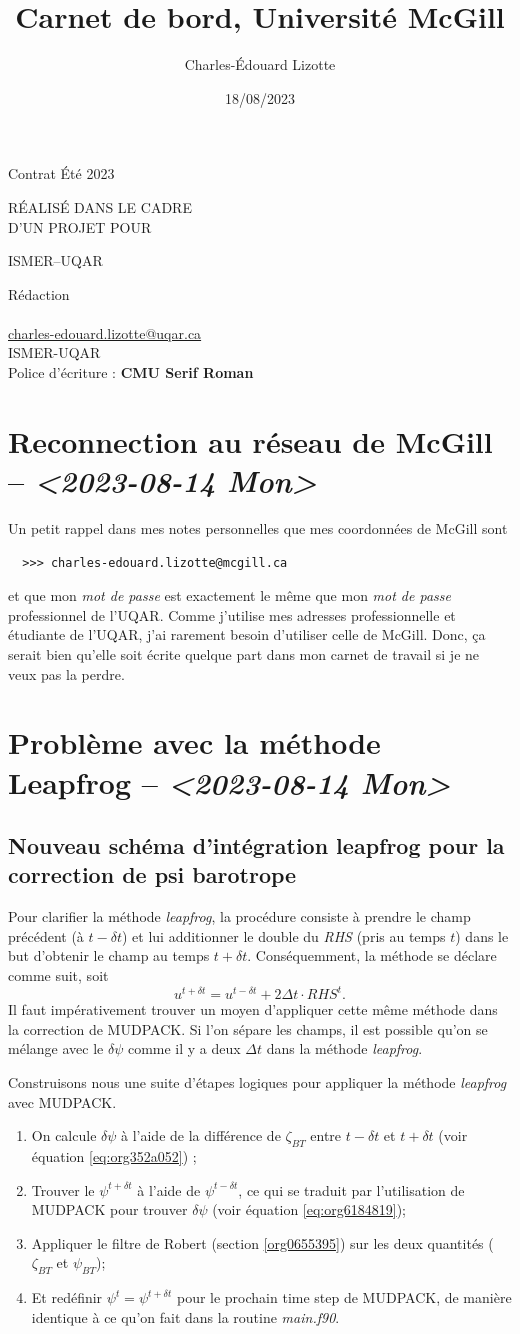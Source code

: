 \documentclass[10pt]{article}
\author{Charles-Édouard Lizotte}
\date{18/08/2023}
\title{Carnet de bord, Université McGill}
\makeatletter
\numberwithin{equation}{section}
\newcommand{\mytitlepage}{
\begin{titlepage}
\begin{center}
{\Huge \thesubtitle \par}
\vspace{2cm}
{\Huge \MakeUppercase{\thetitle} \par}
\vspace{2cm}
RÉALISÉ DANS LE CADRE\\ D'UN PROJET POUR \par
\vspace{2cm}
{\Huge ISMER--UQAR \par}
\vspace{2cm}
{\thedate}
\end{center}
\vfill
Rédaction \\
{\theauthor}\\
\url{charles-edouard.lizotte@uqar.ca}\\
ISMER-UQAR\\
Police d'écriture : \textbf{CMU Serif Roman}
\end{titlepage}
}
\newcommand{\thesubtitle}{Contrat Été 2023}
\makeatother
\begin{document}
\mytitlepage
\tableofcontents\newpage
\section{Reconnection au réseau de McGill -- \textit{<2023-08-14 Mon>}}
\label{sec:orgea7afe0}
Un petit rappel dans mes notes personnelles que mes coordonnées de McGill sont
\begin{verbatim}
  >>> charles-edouard.lizotte@mcgill.ca
\end{verbatim}
et que mon \emph{mot de passe} est exactement le même que mon \emph{mot de passe} professionnel de l'UQAR.
Comme j'utilise mes adresses professionnelle et étudiante de l'UQAR, j'ai rarement besoin d'utiliser celle de McGill.
Donc, ça serait bien qu'elle soit écrite quelque part dans mon carnet de travail si je ne veux pas la perdre.
\section{Problème avec la méthode Leapfrog -- \textit{<2023-08-14 Mon>}}
\label{sec:org303b13b}

\subsection{Nouveau schéma d'intégration leapfrog pour la correction de psi barotrope}
\label{sec:org80eacc6}
Pour clarifier la méthode \emph{leapfrog}, la procédure consiste à prendre le champ précédent (à \(t-\delta t\)) et lui additionner le double du \emph{RHS} (pris au temps \(t\)) dans le but d'obtenir le champ au temps \(t+\delta t\).
Conséquemment, la méthode se déclare comme suit, soit
\begin{equation}
   u^{t+\delta t} = u^{t-\delta t} + 2\Delta t\cdot RHS^t.
\end{equation}
Il faut impérativement trouver un moyen d'appliquer cette même méthode dans la correction de MUDPACK.
Si l'on sépare les champs, il est possible qu'on se mélange avec le \(\delta \psi\) comme il y a deux \(\Delta t\) dans la méthode \emph{leapfrog}.\bigskip

Construisons nous une suite d'étapes logiques pour appliquer la méthode \emph{leapfrog} avec MUDPACK.
\begin{enumerate}
\item On calcule \(\delta \psi\) à l'aide de la différence de \(\zeta_{BT}\) entre \(t-\delta t\) et \(t+\delta t\) (voir équation \ref{eq:org352a052}) ;
\item Trouver le \(\psi^{t+\delta t}\) à l'aide de \(\psi^{t-\delta t}\), ce qui se traduit par l'utilisation de MUDPACK pour trouver \(\delta \psi\) (voir équation \ref{eq:org6184819});
\item Appliquer le filtre de Robert (section \ref{org0655395})  sur les deux quantités (\(\zeta_{BT}\) et \(\psi_{BT}\));
\item Et redéfinir \(\psi^t = \psi^{t+\delta t}\) pour le prochain time step de MUDPACK, de manière identique à ce qu'on fait dans la routine \emph{main.f90}.
\end{enumerate}
\end{document}
